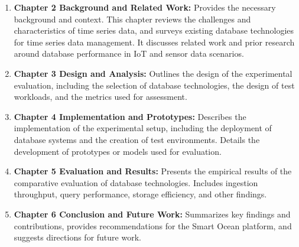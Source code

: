 \begin{enumerate} 
    \item \textbf{Chapter 2 Background and Related Work:} Provides the necessary background and context. This chapter reviews the challenges and characteristics of time series data, and surveys existing database technologies for time series data management. It discusses related work and prior research around database performance in IoT and sensor data scenarios. 

    \item \textbf{Chapter 3 Design and Analysis:} Outlines the design of the experimental evaluation, including the selection of database technologies, the design of test workloads, and the metrics used for assessment. 

    \item \textbf{Chapter 4 Implementation and Prototypes:} Describes the implementation of the experimental setup, including the deployment of database systems and the creation of test environments. Details the development of prototypes or models used for evaluation.
    
    \item \textbf{Chapter 5 Evaluation and Results:} Presents the empirical results of the comparative evaluation of database technologies. Includes ingestion throughput, query performance, storage efficiency, and other findings. 
    
     \item \textbf{Chapter 6 Conclusion and Future Work:} Summarizes key findings and contributions, provides recommendations for the Smart Ocean platform, and suggests directions for future work.

\end{enumerate}
